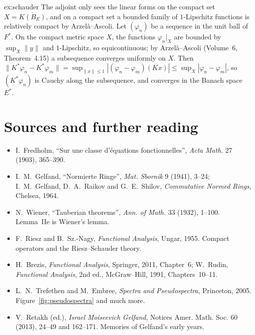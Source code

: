 \begin{solution}{ex:schauder}
\idea The adjoint only sees the linear forms on the compact set $X=\overline{K(B_E)}$, and on a compact set a bounded family of $1$-Lipschitz functions is relatively compact by Arzel\`a--Ascoli.
\writeup Let $(\varphi_n)$ be a sequence in the unit ball of $F^*$. On the compact metric space $X$, the functions $\varphi_n|_X$ are bounded by $\sup_X\|y\|$ and $1$-Lipschitz, so equicontinuous; by Arzel\`a--Ascoli (Volume~6, Theorem~4.15) a
subsequence converges uniformly on $X$. Then $\|K^*\varphi_n-K^*\varphi_m\|=\sup_{\|x\|\le1}|(\varphi_n-\varphi_m)(Kx)|\le\sup_X|\varphi_n-\varphi_m|$, so $(K^*\varphi_n)$ is Cauchy along the subsequence, and converges in the
Banach space $E^*$.
\end{solution}

\section*{Sources and further reading}

\begin{itemize}
\item I.~Fredholm, ``Sur une classe d'\'equations fonctionnelles'', \emph{Acta Math.} 27 (1903), 365--390.
\item I.~M.~Gelfand, ``Normierte Ringe'', \emph{Mat. Sbornik} 9 (1941), 3--24; I.~M.~Gelfand, D.~A.~Raikov and G.~E.~Shilov, \emph{Commutative Normed Rings}, Chelsea, 1964.
\item N.~Wiener, ``Tauberian theorems'', \emph{Ann. of Math.} 33 (1932), 1--100. Lemma~IIe is Wiener's lemma.
\item F.~Riesz and B.~Sz.-Nagy, \emph{Functional Analysis}, Ungar, 1955. Compact operators and the Riesz--Schauder theory.
\item H.~Brezis, \emph{Functional Analysis}, Springer, 2011, Chapter~6; W.~Rudin, \emph{Functional Analysis}, 2nd ed., McGraw--Hill, 1991, Chapters~10--11.
\item L.~N.~Trefethen and M.~Embree, \emph{Spectra and Pseudospectra}, Princeton, 2005. Figure~\ref{fig:pseudospectra} and much more.
\item V.~Retakh (ed.), \emph{Israel Moiseevich Gelfand}, Notices Amer. Math. Soc. 60 (2013), 24--49 and 162--171. Memories of Gelfand's early years.
\end{itemize}
